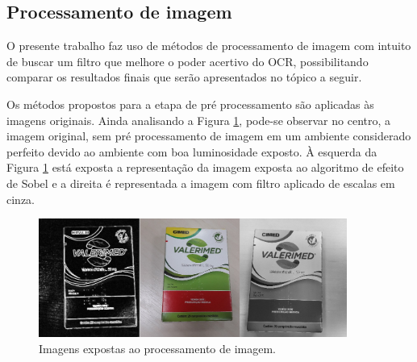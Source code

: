






\subsection{Processamento de imagem}
O presente trabalho faz uso de métodos de processamento de imagem com intuito de buscar um filtro que melhore o poder acertivo do OCR, possibilitando comparar os resultados finais que serão apresentados no tópico a seguir.

Os métodos propostos para a etapa de pré processamento são aplicadas às imagens originais. Ainda analisando a Figura \ref{tratamentoimg}, pode-se observar no centro, a imagem original, sem pré processamento de imagem em um ambiente considerado perfeito devido ao ambiente com boa luminosidade exposto. À esquerda da Figura \ref{tratamentoimg} está exposta a representação da imagem exposta ao algoritmo de efeito de Sobel e a direita é representada a imagem com filtro aplicado de escalas em cinza.

\begin{figure}[h!]
	\centering
	\includegraphics[width=0.90\textwidth]{Imagens/tratamentoimg.jpg} 
	\caption[Imagens expostas ao processamento de imagem.]{Imagens expostas ao processamento de imagem.}
	\label{tratamentoimg}
\end{figure}
